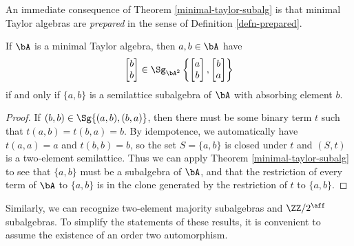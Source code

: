 An immediate consequence of Theorem \ref{minimal-taylor-subalg} is that minimal Taylor algebras are \emph{prepared} in the sense of Definition \ref{defn-prepared}.

\begin{prop}\label{prop-minimal-prepared} If $\bA$ is a minimal Taylor algebra, then $a, b \in \bA$ have
\[
\begin{bmatrix} b\\ b\end{bmatrix} \in \Sg_{\bA^2}\left\{\begin{bmatrix} a\\ b\end{bmatrix}, \begin{bmatrix} b\\ a\end{bmatrix}\right\}
\]
if and only if $\{a,b\}$ is a semilattice subalgebra of $\bA$ with absorbing element $b$.
\end{prop}
\begin{proof} If $(b,b) \in \Sg\{(a,b),(b,a)\}$, then there must be some binary term $t$ such that $t(a,b) = t(b,a) = b$. By idempotence, we automatically have $t(a,a) = a$ and $t(b,b) = b$, so the set $S = \{a,b\}$ is closed under $t$ and $(S,t)$ is a two-element semilattice. Thus we can apply Theorem \ref{minimal-taylor-subalg} to see that $\{a,b\}$ must be a subalgebra of $\bA$, and that the restriction of every term of $\bA$ to $\{a,b\}$ is in the clone generated by the restriction of $t$ to $\{a,b\}$.
\end{proof}

Similarly, we can recognize two-element majority subalgebras and $\ZZ/2^{\aff}$ subalgebras. To simplify the statements of these results, it is convenient to assume the existence of an order two automorphism.

